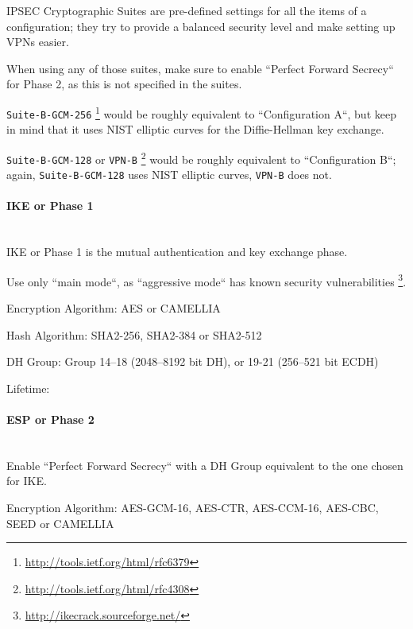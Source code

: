 IPSEC Cryptographic Suites are pre-defined settings for all the
items of a configuration; they try to provide a balanced security
level and make setting up VPNs easier.

When using any of those suites, make sure to enable ``Perfect Forward
Secrecy`` for Phase 2, as this is not specified in the suites.

\verb|Suite-B-GCM-256| \footnote{\url{http://tools.ietf.org/html/rfc6379}}
would be roughly equivalent to ``Configuration A``, but keep in mind
that it uses NIST elliptic curves for the Diffie-Hellman key exchange.

\verb|Suite-B-GCM-128| or
\verb|VPN-B| \footnote{\url{http://tools.ietf.org/html/rfc4308}} would
be roughly equivalent to ``Configuration B``; again,
\verb|Suite-B-GCM-128| uses NIST elliptic curves, \verb|VPN-B| does
not.


\paragraph*{IKE or Phase 1}\mbox{}\\

IKE or Phase 1 is the mutual authentication and key exchange phase.

Use only ``main mode``, as ``aggressive mode`` has known security
vulnerabilities \footnote{\url{http://ikecrack.sourceforge.net/}}.

Encryption Algorithm: AES or CAMELLIA

Hash Algorithm: SHA2-256, SHA2-384 or SHA2-512

DH Group: Group 14--18 (2048--8192 bit DH), or 19-21 (256--521 bit
ECDH)

Lifetime: 


\paragraph*{ESP or Phase 2}\mbox{}\\

Enable ``Perfect Forward Secrecy`` with a DH Group equivalent to the
one chosen for IKE.

Encryption Algorithm: AES-GCM-16, AES-CTR, AES-CCM-16, AES-CBC, SEED
or CAMELLIA 

